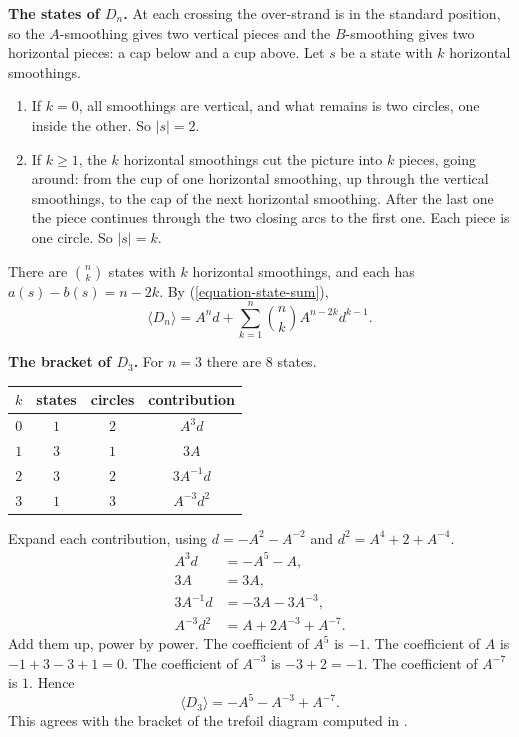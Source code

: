 \medskip\noindent
{\bf The states of $D_n$.} At each
crossing the over-strand is in the
standard position, so the
$A$-smoothing gives two vertical pieces
and the $B$-smoothing gives two
horizontal pieces: a cap below and a
cup above. Let $s$ be a state with $k$
horizontal smoothings.
\begin{enumerate}
\item If $k=0$, all smoothings are
vertical, and what remains is two
circles, one inside the other. So
$|s|=2$.
\item If $k\geq 1$, the $k$ horizontal
smoothings cut the picture into $k$
pieces, going around: from the cup of
one horizontal smoothing, up through
the vertical smoothings, to the cap of
the next horizontal smoothing. After
the last one the piece continues
through the two closing arcs to the
first one. Each piece is one circle. So
$|s|=k$.
\end{enumerate}
There are $\binom{n}{k}$ states with
$k$ horizontal smoothings, and each has
$a(s)-b(s)=n-2k$. By
(\ref{equation-state-sum}),
\begin{equation}
\label{equation-bracket-dn}
\langle D_n\rangle
=A^{n}d
+\sum_{k=1}^{n}\binom{n}{k}
A^{n-2k}d^{k-1}.
\end{equation}

\medskip\noindent
{\bf The bracket of $D_3$.} For $n=3$
there are $8$ states.
\begin{center}
\begin{tabular}{c|c|c|c}
$k$ & states & circles & contribution
\\
\hline
$0$ & $1$ & $2$ & $A^{3}d$ \\
$1$ & $3$ & $1$ & $3A$ \\
$2$ & $3$ & $2$ & $3A^{-1}d$ \\
$3$ & $1$ & $3$ & $A^{-3}d^{2}$
\end{tabular}
\end{center}
Expand each contribution, using
$d=-A^{2}-A^{-2}$ and
$d^{2}=A^{4}+2+A^{-4}$.
$$
\begin{aligned}
A^{3}d&=-A^{5}-A,\\
3A&=3A,\\
3A^{-1}d&=-3A-3A^{-3},\\
A^{-3}d^{2}&=A+2A^{-3}+A^{-7}.
\end{aligned}
$$
Add them up, power by power. The
coefficient of $A^{5}$ is $-1$. The
coefficient of $A$ is $-1+3-3+1=0$. The
coefficient of $A^{-3}$ is $-3+2=-1$.
The coefficient of $A^{-7}$ is $1$.
Hence
\begin{equation}
\label{equation-bracket-trefoil}
\langle D_3\rangle
=-A^{5}-A^{-3}+A^{-7}.
\end{equation}
This agrees with the bracket of the
trefoil diagram computed in
\cite[p.\ 25]{lickorish}.

